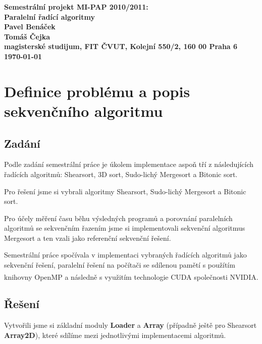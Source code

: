 \documentclass[12pt]{article}
\begin{document}

\begin{center}
\bf Semestrální projekt MI-PAP 2010/2011:\\[5mm]
    Paralelní řadící algoritmy\\[5mm]
    Pavel Benáček\\   
    Tomáš Čejka\\[2mm]
magisterské studijum, FIT ČVUT, Kolejní 550/2, 160 00 Praha 6\\[2mm]
\today
\end{center}
\newpage

\tableofcontents
\listoftables
\newpage
\section{Definice problému a popis sekvenčního algoritmu}
\subsection{Zadání}
Podle zadání semestrální práce je úkolem implementace aspoň tří z následujících
řadících algoritmů: Shearsort, 3D sort, Sudo-lichý Mergesort a Bitonic sort.

Pro řešení jsme si vybrali algoritmy Shearsort, Sudo-lichý Mergesort a Bitonic sort.

Pro účely měření času běhu výsledných programů a porovnání paralelních algoritmů se sekvenčním
řazením jsme si implementovali sekvenční algoritmus Mergesort a ten vzali jako referenční sekvenční
řešení.

Semestrální práce spočívala v implementaci vybraných řadících algoritmů jako sekvenční řešení, paralelní
řešení na počítači se sdílenou pamětí s použítím knihovny OpenMP a následně s využitím technologie CUDA
společnosti NVIDIA\textsuperscript{\tiny{\textregistered}}.

\subsection{Řešení}
Vytvořili jsme si základní moduly \textbf{Loader} a \textbf{Array} (případně ještě pro Shearsort 
\textbf{Array2D}), které sdílíme mezi jednotlivými implementacemi algoritmů.
\end{document}
